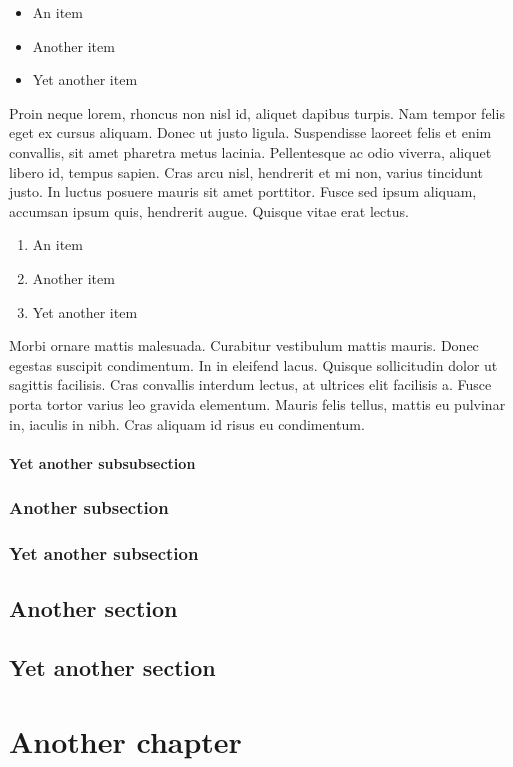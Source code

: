 \documentclass{abe}
\begin{document}
\begin{itemize}
\item An item
\item Another item
\item Yet another item
\end{itemize}

Proin neque lorem, rhoncus non nisl id, aliquet dapibus turpis. Nam tempor felis eget ex cursus aliquam. Donec ut justo ligula. Suspendisse laoreet felis et enim convallis, sit amet pharetra metus lacinia. Pellentesque ac odio viverra, aliquet libero id, tempus sapien. Cras arcu nisl, hendrerit et mi non, varius tincidunt justo. In luctus posuere mauris sit amet porttitor. Fusce sed ipsum aliquam, accumsan ipsum quis, hendrerit augue. Quisque vitae erat lectus.

\begin{enumerate}
\item An item
\item Another item
\item Yet another item
\end{enumerate}

Morbi ornare mattis malesuada. Curabitur vestibulum mattis mauris. Donec egestas suscipit condimentum. In in eleifend lacus. Quisque sollicitudin dolor ut sagittis facilisis. Cras convallis interdum lectus, at ultrices elit facilisis a. Fusce porta tortor varius leo gravida elementum. Mauris felis tellus, mattis eu pulvinar in, iaculis in nibh. Cras aliquam id risus eu condimentum.

\subsubsection{Yet another subsubsection}
\subsection{Another subsection}
\subsection{Yet another subsection}
\section{Another section}
\section{Yet another section}

\chapter{Another chapter}
\end{document}
